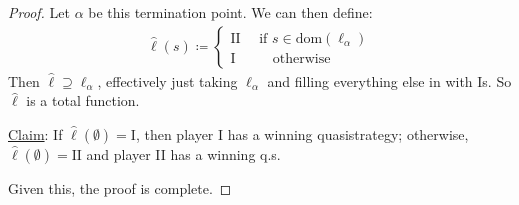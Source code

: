 \documentclass[]{article}
\newcommand{\I}{\textrm{I}}
\newcommand{\II}{\textrm{II}}
\begin{document}
\begin{proof}
    Let $\alpha$ be this termination point. We can then define:
    \begin{align*}
        \hat{\ell}(s)\coloneqq \left\lbrace \begin{array}{c}\II\quad \textrm{ if }s\in \textrm{dom}(\ell_\alpha)\\ \I\qquad \ \ \ \textrm{otherwise}\end{array}\right.
    \end{align*}
    Then $\hat{\ell}\supseteq \ell_\alpha$, effectively just taking $\ell_\alpha$ and filling everything else in with $\I$s. So $\hat{\ell}$ is a total function.

    \underline{Claim}: If $\hat{\ell}(\emptyset) = \I$, then player I has a winning quasistrategy; otherwise, $\hat{\ell}(\emptyset) = \II$ and player II has a winning q.s.

    Given this, the proof is complete.
\end{proof}

\end{document}
